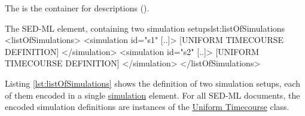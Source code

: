 \label{sec:listOfSimulations}

The  is the container for  descriptions ().
%
%

%
\begin{myXmlLst}{The SED-ML  element, containing two simulation setups}{lst:listOfSimulations}
 <listOfSimulations>
  <simulation id="s1" [..]>
   [UNIFORM TIMECOURSE DEFINITION]
  </simulation>
  <simulation id="s2" [..]>
   [UNIFORM TIMECOURSE DEFINITION]
  </simulation>
 </listOfSimulations>
\end{myXmlLst}
%
Listing \ref{lst:listOfSimulations} shows the definition of two simulation setups, each of them encoded in a single \hyperref[class:simulation]{simulation} element. 
For all SED-ML \LoneVone documents, the encoded simulation definitions are instances of the \hyperref[class:timeCourse]{Uniform Timecourse} class.



